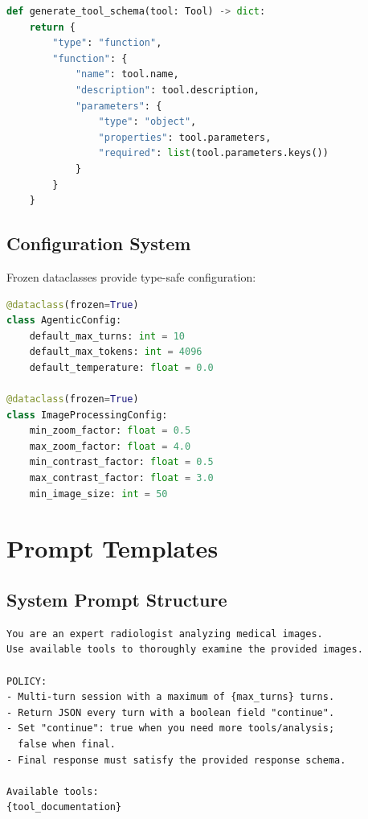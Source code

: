 \documentclass[11pt]{article}
\begin{document}
\begin{lstlisting}[language=Python]
def generate_tool_schema(tool: Tool) -> dict:
    return {
        "type": "function",
        "function": {
            "name": tool.name,
            "description": tool.description,
            "parameters": {
                "type": "object",
                "properties": tool.parameters,
                "required": list(tool.parameters.keys())
            }
        }
    }
\end{lstlisting}

\subsection{Configuration System}

Frozen dataclasses provide type-safe configuration:

\begin{lstlisting}[language=Python]
@dataclass(frozen=True)
class AgenticConfig:
    default_max_turns: int = 10
    default_max_tokens: int = 4096
    default_temperature: float = 0.0

@dataclass(frozen=True)  
class ImageProcessingConfig:
    min_zoom_factor: float = 0.5
    max_zoom_factor: float = 4.0
    min_contrast_factor: float = 0.5
    max_contrast_factor: float = 3.0
    min_image_size: int = 50
\end{lstlisting}

\section{Prompt Templates}

\subsection{System Prompt Structure}

\begin{verbatim}
You are an expert radiologist analyzing medical images.
Use available tools to thoroughly examine the provided images.

POLICY:
- Multi-turn session with a maximum of {max_turns} turns.
- Return JSON every turn with a boolean field "continue".
- Set "continue": true when you need more tools/analysis; 
  false when final.
- Final response must satisfy the provided response schema.

Available tools:
{tool_documentation}
\end{verbatim}
\end{document}
